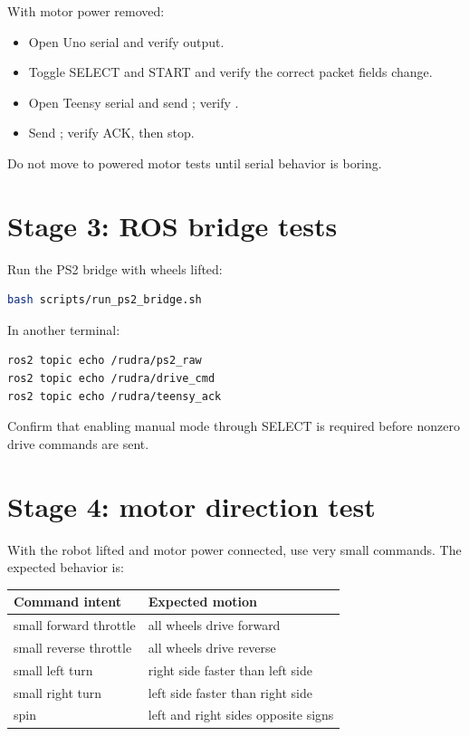 With motor power removed:

\begin{itemize}
  \item Open Uno serial and verify  output.
  \item Toggle SELECT and START and verify the correct packet fields change.
  \item Open Teensy serial and send ; verify .
  \item Send ; verify ACK, then stop.
\end{itemize}

Do not move to powered motor tests until serial behavior is boring.

\section{Stage 3: ROS bridge tests}

Run the PS2 bridge with wheels lifted:

\begin{lstlisting}[language=bash]
bash scripts/run_ps2_bridge.sh
\end{lstlisting}

In another terminal:

\begin{lstlisting}[language=bash]
ros2 topic echo /rudra/ps2_raw
ros2 topic echo /rudra/drive_cmd
ros2 topic echo /rudra/teensy_ack
\end{lstlisting}

Confirm that enabling manual mode through SELECT is required before nonzero drive commands are sent.

\section{Stage 4: motor direction test}

With the robot lifted and motor power connected, use very small commands. The expected behavior is:

\begin{center}
\begin{tabular}{ll}
\toprule
Command intent & Expected motion\\
\midrule
small forward throttle & all wheels drive forward\\
small reverse throttle & all wheels drive reverse\\
small left turn & right side faster than left side\\
small right turn & left side faster than right side\\
spin & left and right sides opposite signs\\
\bottomrule
\end{tabular}
\end{center}

